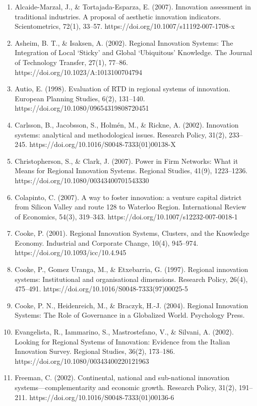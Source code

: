 \documentclass[a4paper,11pt]{article}
\begin{document}
\begin{enumerate}
\item Alcaide-Marzal, J., \& Tortajada-Esparza, E. (2007). Innovation assessment in traditional industries. A proposal of aesthetic innovation indicators. Scientometrics, 72(1), 33–57. https://doi.org/10.1007/s11192-007-1708-x
\item Asheim, B. T., \& Isaksen, A. (2002). Regional Innovation Systems: The Integration of Local ‘Sticky’ and Global ‘Ubiquitous’ Knowledge. The Journal of Technology Transfer, 27(1), 77–86. https://doi.org/10.1023/A:1013100704794
\item Autio, E. (1998). Evaluation of RTD in regional systems of innovation. European Planning Studies, 6(2), 131–140. https://doi.org/10.1080/09654319808720451
\item Carlsson, B., Jacobsson, S., Holmén, M., \& Rickne, A. (2002). Innovation systems: analytical and methodological issues. Research Policy, 31(2), 233–245. https://doi.org/10.1016/S0048-7333(01)00138-X
\item Christopherson, S., \& Clark, J. (2007). Power in Firm Networks: What it Means for Regional Innovation Systems. Regional Studies, 41(9), 1223–1236. https://doi.org/10.1080/00343400701543330
\item Colapinto, C. (2007). A way to foster innovation: a venture capital district from Silicon Valley and route 128 to Waterloo Region. International Review of Economics, 54(3), 319–343. https://doi.org/10.1007/s12232-007-0018-1
\item Cooke, P. (2001). Regional Innovation Systems, Clusters, and the Knowledge Economy. Industrial and Corporate Change, 10(4), 945–974. https://doi.org/10.1093/icc/10.4.945
\item Cooke, P., Gomez Uranga, M., \& Etxebarria, G. (1997). Regional innovation systems: Institutional and organisational dimensions. Research Policy, 26(4), 475–491. https://doi.org/10.1016/S0048-7333(97)00025-5
\item Cooke, P. N., Heidenreich, M., \& Braczyk, H.-J. (2004). Regional Innovation Systems: The Role of Governance in a Globalized World. Psychology Press.
\item Evangelista, R., Iammarino, S., Mastrostefano, V., \& Silvani, A. (2002). Looking for Regional Systems of Innovation: Evidence from the Italian Innovation Survey. Regional Studies, 36(2), 173–186. https://doi.org/10.1080/00343400220121963
\item Freeman, C. (2002). Continental, national and sub-national innovation systems—complementarity and economic growth. Research Policy, 31(2), 191–211. https://doi.org/10.1016/S0048-7333(01)00136-6

\end{enumerate}
\end{document}

